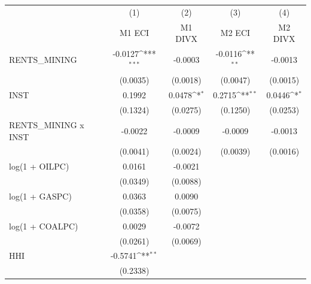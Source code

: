 {
\def\sym#1{\ifmmode^{#1}\else\(^{#1}\)\fi}
\begin{tabular}{l*{4}{c}}
\toprule
                    &\multicolumn{1}{c}{(1)}&\multicolumn{1}{c}{(2)}&\multicolumn{1}{c}{(3)}&\multicolumn{1}{c}{(4)}\\
                    &\multicolumn{1}{c}{M1 ECI}&\multicolumn{1}{c}{M1 DIVX}&\multicolumn{1}{c}{M2 ECI}&\multicolumn{1}{c}{M2 DIVX}\\
\midrule
RENTS\_MINING        &     -0.0127\sym{***}&     -0.0003         &     -0.0116\sym{**} &     -0.0013         \\
                    &    (0.0035)         &    (0.0018)         &    (0.0047)         &    (0.0015)         \\
\addlinespace
INST                &      0.1992         &      0.0478\sym{*}  &      0.2715\sym{**} &      0.0446\sym{*}  \\
                    &    (0.1324)         &    (0.0275)         &    (0.1250)         &    (0.0253)         \\
\addlinespace
RENTS\_MINING x INST &     -0.0022         &     -0.0009         &     -0.0009         &     -0.0013         \\
                    &    (0.0041)         &    (0.0024)         &    (0.0039)         &    (0.0016)         \\
\addlinespace
log(1 + OILPC)      &      0.0161         &     -0.0021         &                     &                     \\
                    &    (0.0349)         &    (0.0088)         &                     &                     \\
\addlinespace
log(1 + GASPC)      &      0.0363         &      0.0090         &                     &                     \\
                    &    (0.0358)         &    (0.0075)         &                     &                     \\
\addlinespace
log(1 + COALPC)     &      0.0029         &     -0.0072         &                     &                     \\
                    &    (0.0261)         &    (0.0069)         &                     &                     \\
\addlinespace
HHI                 &     -0.5741\sym{**} &                     &                     &                     \\
                    &    (0.2338)         &                     &                     &                     \\

\end{tabular}}

